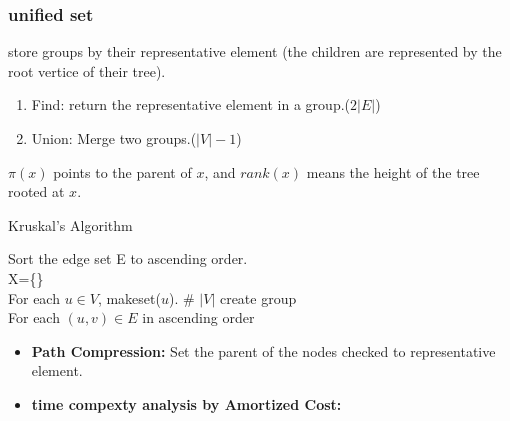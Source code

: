 \subsubsection{unified set} 
store groups by their representative element (the children are represented by the root vertice of their tree).
\begin{enumerate}[-]
    \item Find: return the representative element in a group.($2|E|$)
    \item Union: Merge two groups.($|V|-1$)
\end{enumerate}
$\pi(x)$ points to the parent of $x$, and $rank(x)$ means the height of the tree rooted at $x$.\\
\begin{algorithm}
    \caption{Kruskal's Algorithm}

    Sort the edge set E to ascending order.\\
    X=\{\}\\
    For each $u\in V$, makeset($u$).  \# $|V|$ create group\\
    For each $(u,v) \in E$ in ascending order\\
\end{algorithm}

\begin{itemize}
    \item \textbf{Path Compression:} Set the parent of the nodes checked to representative element.
    \item \textbf{time compexty analysis by Amortized Cost:}
\end{itemize}


